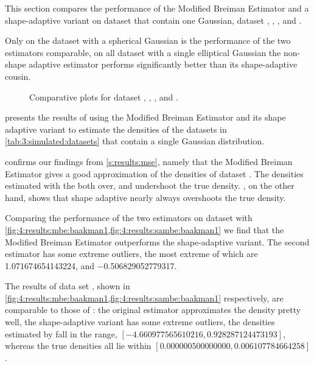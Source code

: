 
This section compares the performance of the Modified Breiman Estimator and a shape-adaptive variant on dataset that contain one Gaussian, \ie dataset \ferdosiOne, \baakmanOne, \baakmanFour, and \baakmanFive.

Only on the dataset with a spherical Gaussian is the performance of the two estimators comparable, on all dataset with a single elliptical Gaussian the non-shape adaptive estimator performs significantly better than its shape-adaptive cousin.

	\begin{figure*}[!ht]
		\centering
		
		\caption{Comparative plots for dataset \ferdosiOneNum, \baakmanOneNum, \baakmanFourNum, and \baakmanFiveNum.
		}
		\label{fig:4:results:singleSphere}
	\end{figure*}

	 presents the results of using the Modified Breiman Estimator and its shape adaptive variant to estimate the densities of the datasets in \cref{tab:3:simulated:datasets} that contain a single Gaussian distribution. 

		 confirms our findings from \cref{s:results:mse}, namely that the Modified Breiman Estimator gives a good approximation of the densities of dataset \ferdosiOne. The densities estimated with the \mbe both over, and undershoot the true density. , on the other hand, shows that shape adaptive \mbe nearly always overshoots the true density. 

		Comparing the performance of the two estimators on dataset \baakmanOne with \cref{fig:4:results:mbe:baakman1,fig:4:results:sambe:baakman1} we find that the Modified Breiman Estimator outperforms the shape-adaptive variant. The second estimator has some extreme outliers, the most extreme of which are \num{1.071674654143224}, and \num{-0.506829052779317}. 

		The results of data set \baakmanFour, shown in \cref{fig:4:results:mbe:baakman1,fig:4:results:sambe:baakman1} respectively, are comparable to those of \baakmanOne: the original estimator approximates the density pretty well, the shape-adaptive variant has some extreme outliers, the densities estimated by \sambe fall in the range, $\left[\num{-4.660977565610216}, \num{0.928287124473193}\right]$, whereas the true densities all lie within $\left[\num[scientific-notation=true]{0.000000500000000}, \num[scientific-notation=true]{0.006107784664258}\right]$.



